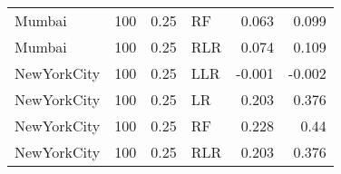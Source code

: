 \begin{tabular}{lrrlrr}
 Mumbai      &              100 &    0.25 & RF      &  0.063 &  0.099 \\
 Mumbai      &              100 &    0.25 & RLR     &  0.074 &  0.109 \\
 NewYorkCity &              100 &    0.25 & LLR     & -0.001 & -0.002 \\
 NewYorkCity &              100 &    0.25 & LR      &  0.203 &  0.376 \\
 NewYorkCity &              100 &    0.25 & RF      &  0.228 &  0.44  \\
 NewYorkCity &              100 &    0.25 & RLR     &  0.203 &  0.376 \\
\bottomrule
\end{tabular}